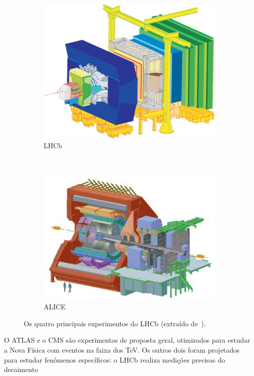 \begin{figure}[h!]
\begin{subfigure}[b]{0.45\textwidth}
        \includegraphics[width=\textwidth]{images/lhcb.jpg}
        \caption{LHCb}
    \end{subfigure}
    ~
    \begin{subfigure}[b]{0.45\textwidth}
        \centering
        \includegraphics[width=\textwidth]{images/alice.jpg}
        \caption{ ALICE}
    \end{subfigure}
    \caption[Os quatro principais experimentos do LHCb]{Os quatro principais
    experimentos do LHCb (extraído de~\cite{ref:solans}).}
    \label{fig:experiments}
\end{figure}

O ATLAS e o CMS são experimentos de proposta geral, otimizados para estudar a
Nova Física com eventos na faixa dos TeV. Os outros dois foram projetados para
estudar fenômenos específicos: o LHCb realiza medições precisas do decaimento


